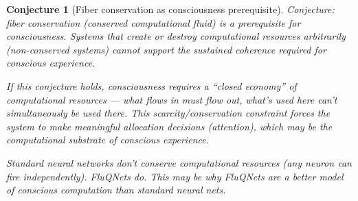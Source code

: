 \documentclass[11pt,a4paper]{article}
\newtheorem{conjecture}[definition]{Conjecture}
\begin{document}
\begin{conjecture}[Fiber conservation as consciousness prerequisite]
Conjecture: fiber conservation (conserved computational fluid) is a
prerequisite for consciousness. Systems that create or destroy
computational resources arbitrarily (non-conserved systems) cannot
support the sustained coherence required for conscious experience.

If this conjecture holds, consciousness requires a ``closed economy''
of computational resources --- what flows in must flow out, what's
used here can't simultaneously be used there. This scarcity/conservation
constraint forces the system to make meaningful allocation decisions
(attention), which may be the computational substrate of conscious
experience.

Standard neural networks don't conserve computational resources (any
neuron can fire independently). FluQNets do. This may be why FluQNets
are a better model of conscious computation than standard neural nets.
\end{conjecture}
\end{document}
